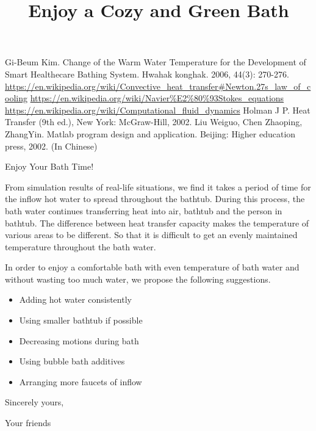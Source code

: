 \documentclass{mcmthesis}
\title{Enjoy a Cozy and Green Bath}
\begin{document}
\begin{abstract}
    
\end{abstract}

\maketitle

\tableofcontents
\thispagestyle{empty}
\newpage

\setcounter{page}{1}



\begin{thebibliography}{99}

     Gi-Beum Kim. Change of the Warm Water Temperature for the Development of Smart Healthecare Bathing System. Hwahak konghak. 2006, 44(3): 270-276.
     \url{https://en.wikipedia.org/wiki/Convective_heat_transfer#Newton.27s_law_of_cooling}
     \url{https://en.wikipedia.org/wiki/Navier\%E2\%80\%93Stokes_equations}
     \url{https://en.wikipedia.org/wiki/Computational_fluid_dynamics}
     Holman J P. Heat Transfer (9th ed.), New York: McGraw-Hill, 2002.
     Liu Weiguo, Chen Zhaoping, ZhangYin. Matlab program design and application. Beijing: Higher education press, 2002. (In Chinese)

\end{thebibliography}
\newpage


\begin{letter}{Enjoy Your Bath Time!}

    From simulation results of real-life situations, we find it takes a period of time for the inflow hot water to spread throughout the bathtub. During this process, the bath water continues transferring heat into air, bathtub and the person in bathtub. The difference between heat transfer capacity makes the temperature of various areas to be different. So that it is difficult to get an evenly maintained temperature throughout the bath water.

    In order to enjoy a comfortable bath with even temperature of bath water and without wasting too much water, we propose the following suggestions.

    \begin{itemize}
        \item Adding hot water consistently
        \item Using smaller bathtub if possible
        \item Decreasing motions during bath
        \item Using bubble bath additives
        \item Arranging more faucets of inflow
    \end{itemize}

    \vspace{\parskip}

    Sincerely yours,

    Your friends

\end{letter}
\newpage
\end{document}
